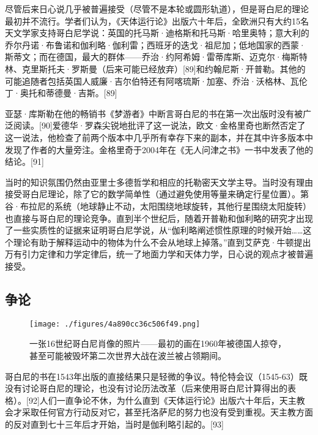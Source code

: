 尽管后来日心说几乎被普遍接受（尽管不是本轮或圆形轨道），但是哥白尼的理论最初并不流行。学者们认为，《天体运行论》出版六十年后，全欧洲只有大约15名天文学家支持哥白尼学说：英国的托马斯·迪格斯和托马斯·哈里奥特；意大利的乔尔丹诺·布鲁诺和伽利略·伽利雷；西班牙的迭戈·祖尼加；低地国家的西蒙·斯蒂文；而在德国，最大的群体——乔治·约阿希姆·雷蒂库斯、迈克尔·梅斯特林、克里斯托夫·罗斯曼（后来可能已经放弃）[89]和约翰尼斯·开普勒。其他的可能追随者包括英国人威廉·吉尔伯特还有阿喀琉斯·加塞、乔治·沃格林、瓦伦丁·奥托和蒂德曼·吉斯。[89]

亚瑟·库斯勒在他的畅销书《梦游者》中断言哥白尼的书在第一次出版时没有被广泛阅读。[90]爱德华·罗森尖锐地批评了这一说法，欧文·金格里奇也断然否定了这一说法，他检查了前两个版本中几乎所有幸存下来的副本，并在其中许多版本中发现了作者的大量旁注。金格里奇于2004年在《无人问津之书》一书中发表了他的结论。[91]

当时的知识氛围仍然由亚里士多德哲学和相应的托勒密天文学主导。当时没有理由接受哥白尼理论，除了它的数学简单性（通过避免使用等量来确定行星位置）。第谷·布拉尼的系统（地球静止不动，太阳围绕地球旋转，其他行星围绕太阳旋转）也直接与哥白尼的理论竞争。直到半个世纪后，随着开普勒和伽利略的研究才出现了一些实质性的证据来证明哥白尼学说，从“伽利略阐述惯性原理的时候开始……这个理论有助于解释运动中的物体为什么不会从地球上掉落。”直到艾萨克·牛顿提出万有引力定律和力学定律后，统一了地面力学和天体力学，日心说的观点才被普遍接受。

\subsection{争论}
\begin{figure}[ht]
\centering
\texttt{[image: ./figures/4a890cc36c506f49.png]}
\caption{一张16世纪哥白尼肖像的照片——最初的画在1960年被德国人掠夺，甚至可能被毁坏第二次世界大战在波兰被占领期间。} \label{fig_GBN_24}
\end{figure}
哥白尼的书在1543年出版的直接结果只是轻微的争议。特伦特会议（1545-63）既没有讨论哥白尼的理论，也没有讨论历法改革（后来使用哥白尼计算得出的表格）。[92]人们一直争论不休，为什么直到《天体运行论》出版六十年后，天主教会才采取任何官方行动反对它，甚至托洛萨尼的努力也没有受到重视。天主教方面的反对直到七十三年后才开始，当时是伽利略引起的。[93]